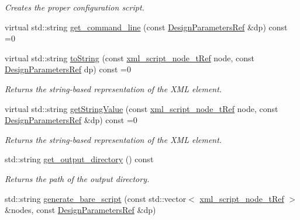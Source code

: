 \begin{DoxyCompactItemize}
\begin{DoxyCompactList}\small\item\em Creates the proper configuration script. \end{DoxyCompactList}\item 
virtual std\+::string \hyperlink{classSynthesisTool_a8eb2ef7a6230a997a2467d298613c045}{get\+\_\+command\+\_\+line} (const \hyperlink{DesignParameters_8hpp_ae36bb1c4c9150d0eeecfe1f96f42d157}{Design\+Parameters\+Ref} \&dp) const =0
\item 
virtual std\+::string \hyperlink{classSynthesisTool_a98c5ba46f950300e1a5ca7cfcb409852}{to\+String} (const \hyperlink{xml__script__command_8hpp_a1fe3d50ade66bc35e41be9b68bbbcd02}{xml\+\_\+script\+\_\+node\+\_\+t\+Ref} node, const \hyperlink{DesignParameters_8hpp_ae36bb1c4c9150d0eeecfe1f96f42d157}{Design\+Parameters\+Ref} dp) const =0
\begin{DoxyCompactList}\small\item\em Returns the string-\/based representation of the X\+ML element. \end{DoxyCompactList}\item 
virtual std\+::string \hyperlink{classSynthesisTool_a730699a51a36280c89b32f324dedc1a7}{get\+String\+Value} (const \hyperlink{xml__script__command_8hpp_a1fe3d50ade66bc35e41be9b68bbbcd02}{xml\+\_\+script\+\_\+node\+\_\+t\+Ref} node, const \hyperlink{DesignParameters_8hpp_ae36bb1c4c9150d0eeecfe1f96f42d157}{Design\+Parameters\+Ref} \&dp) const =0
\begin{DoxyCompactList}\small\item\em Returns the string-\/based representation of the X\+ML element. \end{DoxyCompactList}\item 
std\+::string \hyperlink{classSynthesisTool_ad4f150b7542b6574b43aac22f356c163}{get\+\_\+output\+\_\+directory} () const
\begin{DoxyCompactList}\small\item\em Returns the path of the output directory. \end{DoxyCompactList}\item 
std\+::string \hyperlink{classSynthesisTool_aae5bc9b3dc0428681da3a31ef6566c93}{generate\+\_\+bare\+\_\+script} (const std\+::vector$<$ \hyperlink{xml__script__command_8hpp_a1fe3d50ade66bc35e41be9b68bbbcd02}{xml\+\_\+script\+\_\+node\+\_\+t\+Ref} $>$ \&nodes, const \hyperlink{DesignParameters_8hpp_ae36bb1c4c9150d0eeecfe1f96f42d157}{Design\+Parameters\+Ref} \&dp)
\item 

\end{DoxyCompactItemize}
